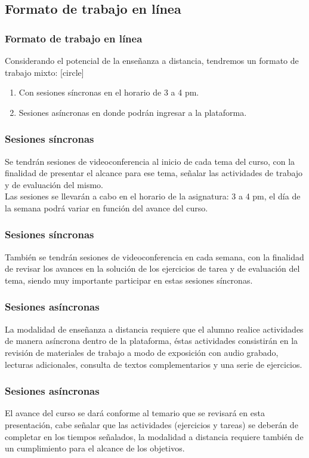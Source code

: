 \subsection{Formato de trabajo en línea}
\begin{frame}
\frametitle{Formato de trabajo en línea}
Considerando el potencial de la enseñanza a distancia, tendremos un formato de trabajo mixto:
[circle]
\begin{enumerate}[<+->]
\item Con sesiones síncronas en el horario de 3 a 4 pm.
\item Sesiones asíncronas en donde podrán ingresar a la plataforma.
\end{enumerate}
\end{frame}
\begin{frame}
\frametitle{Sesiones síncronas}
Se tendrán sesiones de videoconferencia al inicio de cada tema del curso, con la finalidad de presentar el alcance para ese tema, señalar las actividades de trabajo y de evaluación del mismo.
\\
\bigskip
Las sesiones se llevarán a cabo en el horario de la asignatura: 3 a 4 pm, el día de la semana podrá variar en función del avance del curso. 
\end{frame}
\begin{frame}
\frametitle{Sesiones síncronas}
También se tendrán sesiones de videoconferencia en cada semana, con la finalidad de revisar los avances en la solución de los ejercicios de tarea y de evaluación del tema, siendo muy importante participar en estas sesiones síncronas.
\end{frame}
\begin{frame}
\frametitle{Sesiones asíncronas}
La modalidad de enseñanza a distancia requiere que el alumno realice actividades de manera asíncrona dentro de la plataforma, éstas actividades consistirán en la revisión de materiales de trabajo a modo de exposición con audio grabado, lecturas adicionales, consulta de textos complementarios y una serie de ejercicios.
\end{frame}
\begin{frame}
\frametitle{Sesiones asíncronas}
El avance del curso se dará conforme al temario que se revisará en esta presentación, cabe señalar que las actividades (ejercicios y tareas) se deberán de completar en los tiempos señalados, la modalidad a distancia requiere también de un cumplimiento para el alcance de los objetivos.
\end{frame}
